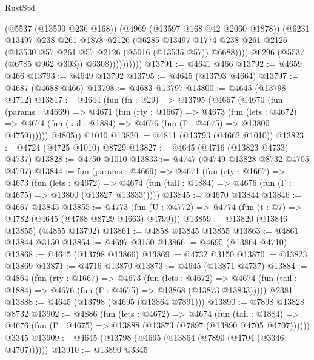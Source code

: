 \begin{lexlean}{RustStd}
\begin{coremodule}
                          (@5537 (@13590 @236 @168))
                          (@4969 (@13597 @168 @42 @2060 @1878))
                          (@6231
                            @13497
                            @238
                            @261
                            @1878
                            @2126
                            (@6285
                              @13497
                              @1774
                              @238
                              @261
                              @2126
                              (@13530 @57 @261 @57 @2126 (@5016 (@13535 @57)) @6688))))
                        @6296
                        (@5537 (@6785 @962 @303))
                        @6308))))))))))
@13791 := @4641 @466
@13792 := @4659 @466
@13793 := @4649 @13792
@13795 := @4645 (@13793 @4664)
@13797 := @4687 (@4688 @466)
@13798 := @4683 @13797
@13800 := @4645 (@13798 @4712)
@13817 := @4644
    (fun (fn : @29) =>
    @13795
      (@4667
        (@4670
          (fun (params : @4669) =>
          @4671
            (fun (rty : @1667) =>
            @4673
              (fun (lets : @4672) =>
              @4674 (fun (tail : @1884) => @4676 (fun (Γ : @4675) => @13800 @4759))))))
        @4805))
    @1010
@13820 := @4811 (@13793 (@4662 @1010))
@13823 := @4724 (@4725 @1010) @8729
@13827 := @4645 (@4716 (@13823 @4733) @4737)
@13828 := @4750 @1010
@13833 := @4747 (@4749 @13828 @8732 @4705 @4707)
@13844 := fun (params : @4669) =>
  @4671
    (fun (rty : @1667) =>
    @4673
      (fun (lets : @4672) =>
      @4674 (fun (tail : @1884) => @4676 (fun (Γ : @4675) => @13800 (@13827 @13833)))))
@13845 := @4670 @13844
@13846 := @4667 @13845
@13855 := @4773 (fun (U : @4772) => @4774 (fun (t : @7) => @4782 (@4645 (@4788 @8729 @4663) @4799)))
@13859 := @13820 (@13846 @13855) (@4855 @13792)
@13861 := @4858 @13845 @13855
@13863 := @4861 @13844 @3150
@13864 := @4697 @3150
@13866 := @4695 (@13864 @4710)
@13868 := @4645 (@13798 @13866)
@13869 := @4732 @3150
@13870 := @13823 @13869
@13871 := @4716 @13870
@13873 := @4645 (@13871 @4737)
@13884 := @4864
    (fun (rty : @1667) =>
    @4673
      (fun (lets : @4672) =>
      @4674 (fun (tail : @1884) => @4676 (fun (Γ : @4675) => @13868 (@13873 @13833)))))
    @2381
@13888 := @4645 (@13798 (@4695 (@13864 @7891)))
@13890 := @7898 @13828 @8732
@13902 := @4886
    (fun (lets : @4672) =>
    @4674
      (fun (tail : @1884) =>
      @4676 (fun (Γ : @4675) => @13888 (@13873 (@7897 (@13890 @4705 @4707))))))
    @3345
@13909 := @4645 (@13798 (@4695 (@13864 (@7890 (@4704 (@3346 @4707))))))
@13910 := @13890 @3345

\end{coremodule}
\end{lexlean}
